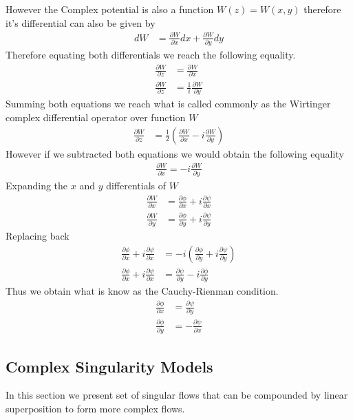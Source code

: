 However the Complex potential is also a function $W(z) = W(x,y)$ therefore it's differential can also be given by
\begin{align}
    dW &= \frac{\partial W}{\partial x}dx  +  \frac{\partial W}{\partial y}dy 
\end{align}
Therefore equating both differentials we reach the following equality.
\begin{align}
     \frac{\partial W}{\partial z}  &= \frac{\partial W}{\partial x}\\
     \frac{\partial W}{\partial z}  &= \frac{1}{i}\frac{\partial W}{\partial y} 
\end{align}
Summing both equations we reach what is called commonly as the Wirtinger complex differential operator over function $W$
\begin{align}
     \frac{\partial W}{\partial z}  &= \frac{1}{2} \left(\frac{\partial W}{\partial x} - i\frac{\partial W}{\partial y} \right)
\end{align}
However if we subtracted both equations we would obtain the following equality
\begin{align}
     \frac{\partial W}{\partial x} = - i\frac{\partial W}{\partial y}
\end{align}
Expanding the $x$ and $y$ differentials of $W$
\begin{align}
    \frac{\partial W}{\partial x} &= \frac{\partial \phi}{\partial x} + i\frac{\partial \psi}{\partial x} \\  
    \frac{\partial W}{\partial y} &=  \frac{\partial \phi}{\partial y} + i\frac{\partial \psi}{\partial y}  
\end{align}
Replacing back
\begin{align}
     \frac{\partial \phi}{\partial x} + i\frac{\partial \psi}{\partial x} &= - i\left( \frac{\partial \phi}{\partial y} + i\frac{\partial \psi}{\partial y}  \right) \\
     \frac{\partial \phi}{\partial x} + i\frac{\partial \psi}{\partial x} &= \frac{\partial \psi}{\partial y} - i\frac{\partial \phi}{\partial y} 
\end{align}
Thus we obtain what is know as the Cauchy-Rienman condition.
 \begin{align}
     \frac{\partial \phi}{\partial x} &= \frac{\partial \psi}{\partial y} \\
     \frac{\partial \phi}{\partial y} &= -\frac{\partial \psi}{\partial x} 
\end{align}


\newpage
\subsection{Complex Singularity Models}
In this section we present set of singular flows that can be compounded by linear superposition to form more complex flows.  
